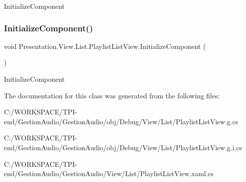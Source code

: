 Initialize\+Component 

\mbox{\label{class_presentation_1_1_view_1_1_list_1_1_playlist_list_view_aa9bf1ecd779db592df3c013a92d6e218}} 
\subsubsection{\texorpdfstring{Initialize\+Component()}{InitializeComponent()}\hspace{0.1cm}{\footnotesize\ttfamily [4/4]}}
{\footnotesize\ttfamily void Presentation.\+View.\+List.\+Playlist\+List\+View.\+Initialize\+Component (\begin{DoxyParamCaption}{ }\end{DoxyParamCaption})}



Initialize\+Component 



The documentation for this class was generated from the following files\+:\begin{DoxyCompactItemize}
\item 
C\+:/\+W\+O\+R\+K\+S\+P\+A\+C\+E/\+T\+P\+I-\/end/\+Gestion\+Audio/\+Gestion\+Audio/obj/\+Debug/\+View/\+List/Playlist\+List\+View.\+g.\+cs\item 
C\+:/\+W\+O\+R\+K\+S\+P\+A\+C\+E/\+T\+P\+I-\/end/\+Gestion\+Audio/\+Gestion\+Audio/obj/\+Debug/\+View/\+List/Playlist\+List\+View.\+g.\+i.\+cs\item 
C\+:/\+W\+O\+R\+K\+S\+P\+A\+C\+E/\+T\+P\+I-\/end/\+Gestion\+Audio/\+Gestion\+Audio/\+View/\+List/Playlist\+List\+View.\+xaml.\+cs\end{DoxyCompactItemize}
